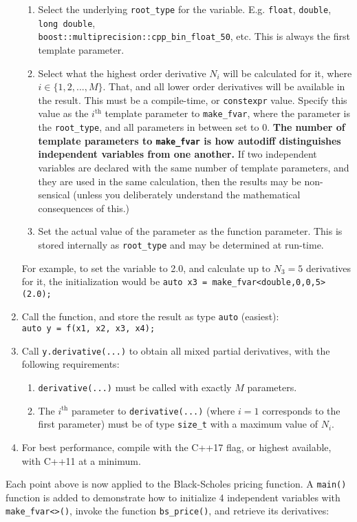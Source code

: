 \documentclass{article}
\begin{document}
\begin{enumerate}
  \begin{enumerate}
  \item Select the underlying {\tt root\_type} for the variable. E.g. {\tt float}, {\tt double}, {\tt long double},\\
    {\tt boost::multiprecision::cpp\_bin\_float\_50}, etc. This is always the first template parameter.
  \item Select what the highest order derivative $N_i$ will be calculated for it, where $i\in\{1,2,...,M\}$.
    That, and all lower order derivatives will be available in the result. This must be a compile-time, or
    {\tt constexpr} value. Specify this value as the $i^\text{th}$ template parameter to {\tt make\_fvar},
    where the  parameter is the {\tt root\_type}, and all parameters in between set to 0. {\bf The number
    of template parameters to {\tt make\_fvar} is how autodiff distinguishes independent variables from one
    another.} If two independent variables are declared with the same number of template parameters, and they
    are used in the same calculation, then the results may be non-sensical (unless you deliberately understand
    the mathematical consequences of this.)
  \item Set the actual value of the parameter as the function parameter. This is stored internally as
    {\tt root\_type} and may be determined at run-time.
  \end{enumerate}
  For example, to set the  variable to 2.0, and calculate up to $N_3=5$ derivatives for it, the initialization
  would be {\tt auto x3 = make\_fvar<double,0,0,5>(2.0);}
\item Call the function, and store the result as type {\tt auto} (easiest):\\
  {\tt auto y = f(x1, x2, x3, x4);}
\item Call {\tt y.derivative(...)} to obtain all mixed partial derivatives, with the following requirements:
  \begin{enumerate}
  \item {\tt derivative(...)} must be called with exactly $M$ parameters.
  \item The $i^\text{th}$ parameter to {\tt derivative(...)} (where $i=1$ corresponds to the first parameter) must
    be of type {\tt size\_t} with a maximum value of $N_i$.
  \end{enumerate}
\item For best performance, compile with the C++17 flag, or highest available, with C++11 at a minimum.
\end{enumerate}
Each point above is now applied to the Black-Scholes pricing function. A {\tt main()} function is added to demonstrate
how to initialize 4 independent variables with {\tt make\_fvar<>()}, invoke the function {\tt bs\_price()}, and
retrieve its derivatives:
\end{document}

